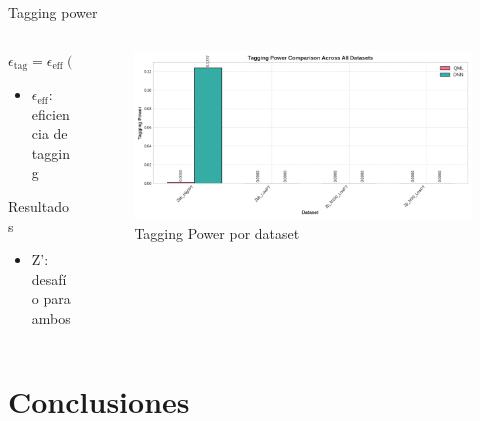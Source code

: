 \documentclass[aspectratio=43]{beamer}
\begin{document}
\begin{frame}{Tagging power}
  \begin{columns}
    \begin{column}{0.48\textwidth}
      \begin{block}{\texorpdfstring{$\epsilon_{\text{tag}} = \epsilon_{\text{eff}}(2a-1)^2$}{Tagging power Formula}}
        \begin{itemize}
          \item \texorpdfstring{$\epsilon_{\text{eff}}$}{epsilon\_eff}: eficiencia de tagging
        \end{itemize}
      \end{block}
      \vspace{-0.2em}
      \begin{alertblock}{Resultados}
        \begin{itemize}
          \item Z': desafío para ambos
        \end{itemize}
      \end{alertblock}
    \end{column}
    \begin{column}{0.5\textwidth}
      \begin{figure}
        \includegraphics[width=\textwidth]{resumen_hmmm/tagging_power_all_datasets.png}
        \caption{\small Tagging Power por dataset}
      \end{figure}
    \end{column}
  \end{columns}
\end{frame}

\section{Conclusiones}
\end{document}

